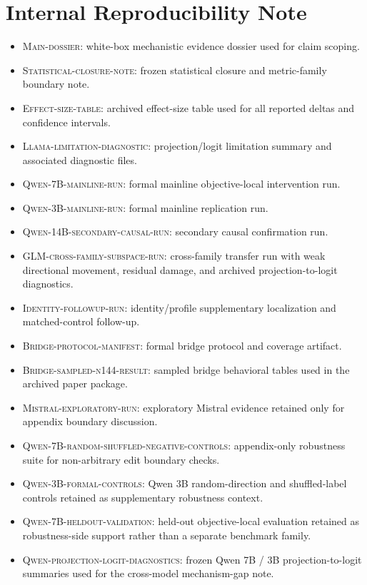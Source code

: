 \documentclass[11pt]{article}
\newcommand{\artifact}[1]{\textsc{#1}}
\begin{document}
\section{Internal Reproducibility Note}

\begin{itemize}[leftmargin=*]
  \item \artifact{Main-dossier}: white-box mechanistic evidence dossier used for claim scoping.
  \item \artifact{Statistical-closure-note}: frozen statistical closure and metric-family boundary note.
  \item \artifact{Effect-size-table}: archived effect-size table used for all reported deltas and confidence intervals.
  \item \artifact{Llama-limitation-diagnostic}: projection/logit limitation summary and associated diagnostic files.
  \item \artifact{Qwen-7B-mainline-run}: formal mainline objective-local intervention run.
  \item \artifact{Qwen-3B-mainline-run}: formal mainline replication run.
  \item \artifact{Qwen-14B-secondary-causal-run}: secondary causal confirmation run.
  \item \artifact{GLM-cross-family-subspace-run}: cross-family transfer run with weak directional movement, residual damage, and archived projection-to-logit diagnostics.
  \item \artifact{Identity-followup-run}: identity/profile supplementary localization and matched-control follow-up.
  \item \artifact{Bridge-protocol-manifest}: formal bridge protocol and coverage artifact.
  \item \artifact{Bridge-sampled-n144-result}: sampled bridge behavioral tables used in the archived paper package.
  \item \artifact{Mistral-exploratory-run}: exploratory Mistral evidence retained only for appendix boundary discussion.
  \item \artifact{Qwen-7B-random-shuffled-negative-controls}: appendix-only robustness suite for non-arbitrary edit boundary checks.
  \item \artifact{Qwen-3B-formal-controls}: Qwen 3B random-direction and shuffled-label controls retained as supplementary robustness context.
  \item \artifact{Qwen-7B-heldout-validation}: held-out objective-local evaluation retained as robustness-side support rather than a separate benchmark family.
  \item \artifact{Qwen-projection-logit-diagnostics}: frozen Qwen 7B / 3B projection-to-logit summaries used for the cross-model mechanism-gap note.
\end{itemize}
\end{document}
